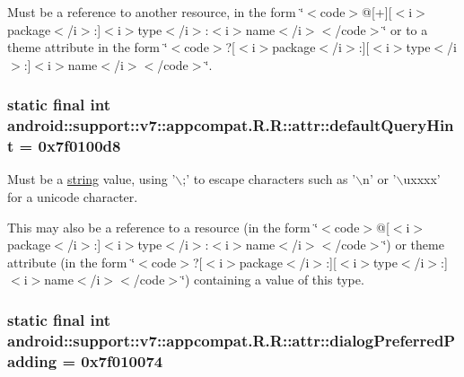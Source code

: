 Must be a reference to another resource, in the form \char`\"{}$<$code$>$@\mbox{[}+\mbox{]}\mbox{[}$<$i$>$package$<$/i$>$:\mbox{]}$<$i$>$type$<$/i$>$:$<$i$>$name$<$/i$>$$<$/code$>$\char`\"{} or to a theme attribute in the form \char`\"{}$<$code$>$?\mbox{[}$<$i$>$package$<$/i$>$:\mbox{]}\mbox{[}$<$i$>$type$<$/i$>$:\mbox{]}$<$i$>$name$<$/i$>$$<$/code$>$\char`\"{}. \hypertarget{classandroid_1_1support_1_1v7_1_1appcompat_1_1_r_1_1attr_ef4e06325d6e9e66be66a35c247f876e}{
\subsubsection[{defaultQueryHint}]{\setlength{\rightskip}{0pt plus 5cm}static final int android::support::v7::appcompat.R.R::attr::defaultQueryHint = 0x7f0100d8}}
\label{classandroid_1_1support_1_1v7_1_1appcompat_1_1_r_1_1attr_ef4e06325d6e9e66be66a35c247f876e}


Must be a \hyperlink{classandroid_1_1support_1_1v7_1_1appcompat_1_1_r_1_1string}{string} value, using '$\backslash$;' to escape characters such as '$\backslash$n' or '$\backslash$uxxxx' for a unicode character. 

This may also be a reference to a resource (in the form \char`\"{}$<$code$>$@\mbox{[}$<$i$>$package$<$/i$>$:\mbox{]}$<$i$>$type$<$/i$>$:$<$i$>$name$<$/i$>$$<$/code$>$\char`\"{}) or theme attribute (in the form \char`\"{}$<$code$>$?\mbox{[}$<$i$>$package$<$/i$>$:\mbox{]}\mbox{[}$<$i$>$type$<$/i$>$:\mbox{]}$<$i$>$name$<$/i$>$$<$/code$>$\char`\"{}) containing a value of this type. \hypertarget{classandroid_1_1support_1_1v7_1_1appcompat_1_1_r_1_1attr_52bf8ee89c096a0442fe38bec06de858}{
\subsubsection[{dialogPreferredPadding}]{\setlength{\rightskip}{0pt plus 5cm}static final int android::support::v7::appcompat.R.R::attr::dialogPreferredPadding = 0x7f010074}}
\label{classandroid_1_1support_1_1v7_1_1appcompat_1_1_r_1_1attr_52bf8ee89c096a0442fe38bec06de858}


